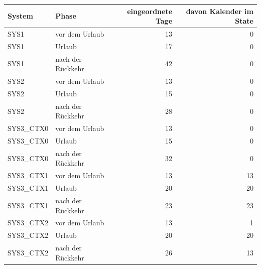 \begin{tabular}{llrr}
\toprule
System & Phase & eingeordnete Tage & davon Kalender im State \\
\midrule
SYS1 & vor dem Urlaub & 13 & 0 \\
SYS1 & Urlaub & 17 & 0 \\
SYS1 & nach der Rückkehr & 42 & 0 \\
SYS2 & vor dem Urlaub & 13 & 0 \\
SYS2 & Urlaub & 15 & 0 \\
SYS2 & nach der Rückkehr & 28 & 0 \\
SYS3\_CTX0 & vor dem Urlaub & 13 & 0 \\
SYS3\_CTX0 & Urlaub & 15 & 0 \\
SYS3\_CTX0 & nach der Rückkehr & 32 & 0 \\
SYS3\_CTX1 & vor dem Urlaub & 13 & 13 \\
SYS3\_CTX1 & Urlaub & 20 & 20 \\
SYS3\_CTX1 & nach der Rückkehr & 23 & 23 \\
SYS3\_CTX2 & vor dem Urlaub & 13 & 1 \\
SYS3\_CTX2 & Urlaub & 20 & 20 \\
SYS3\_CTX2 & nach der Rückkehr & 26 & 13 \\
\bottomrule
\end{tabular}
